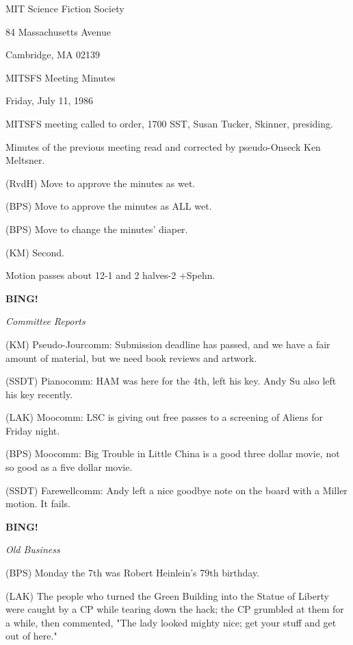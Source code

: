 \documentclass[12pt]{article}
\newcommand{\bing}{{\bf BING!} }
\newcommand{\goto}[1]{\bing \vskip 12pt \centerline{{\em{#1}}}}
\begin{document}
\begin{center}

MIT Science Fiction Society 

84 Massachusetts Avenue

Cambridge, MA 02139

\vspace{12pt}

MITSFS Meeting Minutes 

Friday, July 11, 1986

\end{center}
 
\vspace{18pt}

\setlength{\parskip}{6pt}

\noindent
MITSFS meeting called to order, 1700 SST,
Susan Tucker, Skinner, presiding.

Minutes of the previous meeting read and corrected by pseudo-Onseck Ken Meltsner.

(RvdH) Move to approve the minutes as wet.

(BPS) Move to approve the minutes as ALL wet.

(BPS) Move to change the minutes' diaper.

(KM) Second.

Motion passes about 12-1 and 2 halves-2 +Spehn.

\goto{Committee Reports}

(KM) Pseudo-Jourcomm: Submission deadline has passed, and we have a fair amount of material, but we need book reviews and artwork.

(SSDT) Pianocomm: HAM was here for the 4th, left his key. Andy Su also left his key recently.

(LAK) Moocomm: LSC is giving out free passes to a screening of Aliens for Friday night.

(BPS) Moocomm: Big Trouble in Little China is a good three dollar movie, not so good as a five dollar movie.

(SSDT) Farewellcomm: Andy left a nice goodbye note on the board with a Miller motion. It fails.

\goto{Old Business}

(BPS) Monday the 7th was Robert Heinlein's 79th birthday.

(LAK) The people who turned the Green Building into the Statue of Liberty were caught by a CP while tearing down the hack; the CP grumbled at them for a while, then commented, "The lady looked mighty nice; get your stuff and get out of here."
\end{document}
